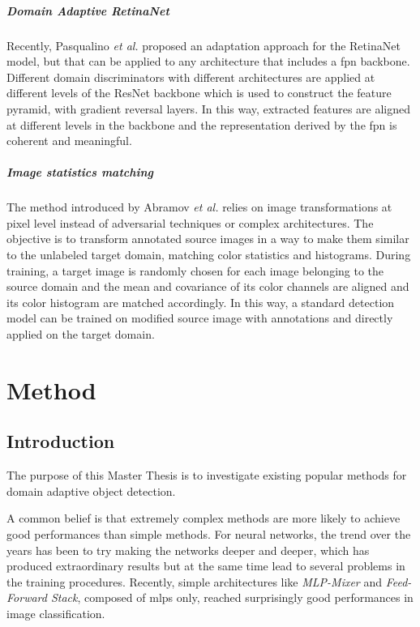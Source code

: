 \documentclass[%
    corpo=12pt,
    twoside,
    stile=classica,   
    tipotesi=magistrale,
    evenboxes,
    english
]{toptesi}
\begin{document}
\paragraph{Domain Adaptive RetinaNet}\label{sec:daretinanet}
Recently, Pasqualino \emph{et al.}\cite{pasqualino2020unsupervised} proposed an adaptation approach for the RetinaNet model, but that can be applied to any architecture that includes a \gls{fpn} backbone. Different domain discriminators with different architectures are applied at different levels of the ResNet backbone which is used to construct the feature pyramid, with gradient reversal layers. In this way, extracted features are aligned at different levels in the backbone and the representation derived by the \gls{fpn} is coherent and meaningful.

\paragraph{Image statistics matching}\label{sec:kis}
The method introduced by Abramov \emph{et al.}\cite{abramov2020simple} relies on image transformations at pixel level instead of adversarial techniques or complex architectures. The objective is to transform annotated source images in a way to make them similar to the unlabeled target domain, matching color statistics and histograms. During training, a target image is randomly chosen for each image belonging to the source domain and the mean and covariance of its color channels are aligned and its color histogram are matched accordingly. In this way, a standard detection model can be trained on modified source image with annotations and directly applied on the target domain.



\chapter{Method}
\section{Introduction}
The purpose of this Master Thesis is to investigate existing popular methods for domain adaptive object detection.

A common belief is that extremely complex methods are more likely to achieve good performances than simple methods. For neural networks, the trend over the years has been to try making the networks deeper and deeper, which has produced extraordinary results but at the same time lead to several problems in the training procedures. Recently, simple architectures like \textit{MLP-Mixer}\cite{tolstikhin2021mlpmixer} and \textit{Feed-Forward Stack}\cite{melaskyriazi2021need}, composed of \glspl{mlp} only, reached surprisingly good performances in image classification.
\end{document}
